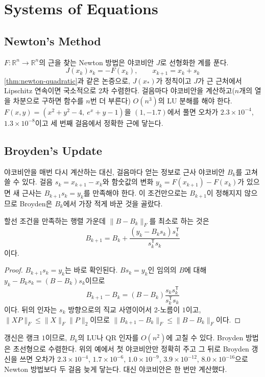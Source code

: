 \section{Systems of Equations}
\label{sec:systems}

\subsection{Newton's Method}

$F:\mathbb R^n\to\mathbb R^n$의 근을 찾는 Newton 방법은 야코비안 $J$로 선형화한 계를 푼다.
\[
J(x_k)s_k=-F(x_k),\qquad x_{k+1}=x_k+s_k
\]
\cref{thm:newton-quadratic}과 같은 논증으로, $J(x_\ast)$가 정칙이고 $J$가 근 근처에서 Lipschitz 연속이면 국소적으로 2차 수렴한다\cite{ortega2000}. 걸음마다 야코비안을 계산하고($n$개의 열을 차분으로 구하면 함수를 $n$번 더 부른다) $O(n^3)$의 LU 분해를 해야 한다. $F(x,y)=(x^2+y^2-4,\ e^x+y-1)$을 $(1,-1.7)$에서 풀면 오차가 $2.3\times10^{-4}$, $1.3\times10^{-8}$이고 세 번째 걸음에서 정확한 근에 닿는다.

\subsection{Broyden's Update}

야코비안을 매번 다시 계산하는 대신, 걸음마다 얻는 정보로 근사 야코비안 $B_k$를 고쳐 쓸 수 있다. 걸음 $s_k=x_{k+1}-x_k$와 함숫값의 변화 $y_k=F(x_{k+1})-F(x_k)$가 있으면 새 근사는  $B_{k+1}s_k=y_k$를 만족해야 한다. 이 조건만으로는 $B_{k+1}$이 정해지지 않으므로 Broyden은 $B_k$에서 가장 적게 바꾼 것을 골랐다\cite{broyden1965}.

\begin{proposition}
\label{prop:broyden}
할선 조건을 만족하는 행렬 가운데 $\|B-B_k\|_F$를 최소로 하는 것은
\[
B_{k+1}=B_k+\frac{(y_k-B_ks_k)s_k^{\mathsf T}}{s_k^{\mathsf T}s_k}
\]
이다.
\end{proposition}

\begin{proof}
$B_{k+1}s_k=y_k$는 바로 확인된다. $Bs_k=y_k$인 임의의 $B$에 대해 $y_k-B_ks_k=(B-B_k)s_k$이므로
\[
B_{k+1}-B_k=(B-B_k)\frac{s_ks_k^{\mathsf T}}{s_k^{\mathsf T}s_k}
\]
이다. 뒤의 인자는 $s_k$ 방향으로의 직교 사영이어서 2-노름이 $1$이고, $\|XP\|_F\le\|X\|_F\|P\|_2$이므로 $\|B_{k+1}-B_k\|_F\le\|B-B_k\|_F$이다.
\end{proof}

갱신은 랭크 $1$이므로, $B_k$의 LU나 QR 인자를 $O(n^2)$에 고칠 수 있다. Broyden 방법은 초선형으로 수렴한다\cite{dennis1977quasi}. 위의 예에서 첫 야코비안만 정확히 주고 그 뒤로 Broyden 갱신을 쓰면 오차가 $2.3\times10^{-4}$, $1.7\times10^{-6}$, $1.0\times10^{-9}$, $3.9\times10^{-12}$, $8.0\times10^{-16}$으로 Newton 방법보다 두 걸음 늦게 닿는다. 대신 야코비안은 한 번만 계산했다.

